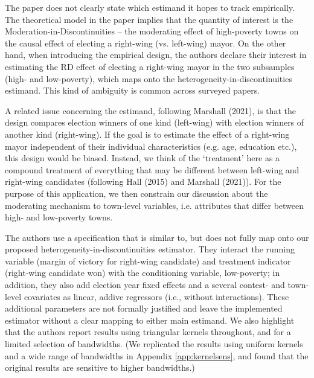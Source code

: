 \documentclass[12pt]{article}
\begin{document}
The paper does not clearly state which estimand it hopes to track empirically. The theoretical model in the paper implies that the quantity of interest is the Moderation-in-Discontinuities -- the moderating effect of high-poverty towns on the causal effect of electing a right-wing (vs. left-wing) mayor. On the other hand, when introducing the empirical design, the authors declare their interest in estimating the RD effect of electing a right-wing mayor in the two subsamples (high- and low-poverty), which maps onto the heterogeneity-in-discontinuities estimand. This kind of ambiguity is common across surveyed papers.

A related issue concerning the estimand, following Marshall (2021), is that the design compares election winners of one kind (left-wing) with election winners of another kind (right-wing). If the goal is to estimate the effect of a right-wing mayor independent of their individual characteristics (e.g. age, education etc.), this design would be biased. Instead, we think of the `treatment' here as a compound treatment of everything that may be different between left-wing and right-wing candidates (following Hall (2015) and Marshall (2021)). For the purpose of this application, we then constrain our discussion about the moderating mechanism to town-level variables, i.e. attributes that differ between high- and low-poverty towns.

The authors use a specification that is similar to, but does not fully map onto our proposed heterogeneity-in-discontinuities estimator. They interact the running variable (margin of victory for right-wing candidate) and treatment indicator (right-wing candidate won) with the conditioning variable, low-poverty; in addition, they also add election year fixed effects and a several contest- and town-level covariates as linear, addive regressors (i.e., without interactions). These additional parameters are not formally justified and leave the implemented estimator without a clear mapping to either main estimand. We also highlight that the authors report results using triangular kernels throughout, and for a limited selection of bandwidths. (We replicated the results using uniform kernels and a wide range of bandwidths in Appendix \ref{app:kernelsens}, and found that the original results are sensitive to higher bandwidths.)
\end{document}
